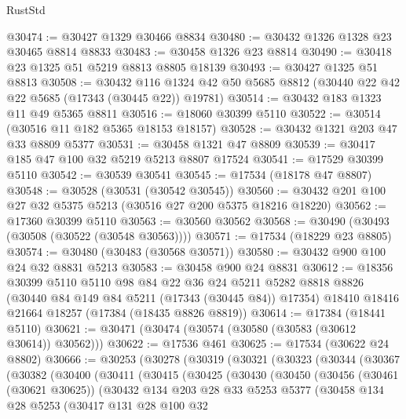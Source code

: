\begin{lexlean}{RustStd}
\begin{coremodule}
@30474 := @30427 @1329 @30466 @8834
@30480 := @30432 @1326 @1328 @23 @30465 @8814 @8833
@30483 := @30458 @1326 @23 @8814
@30490 := @30418 @23 @1325 @51 @5219 @8813 @8805 @18139
@30493 := @30427 @1325 @51 @8813
@30508 := @30432
    @116
    @1324
    @42
    @50
    @5685
    @8812
    (@30440 @22 @42 @22 @5685 (@17343 (@30445 @22)) @19781)
@30514 := @30432 @183 @1323 @11 @49 @5365 @8811
@30516 := @18060 @30399 @5110
@30522 := @30514 (@30516 @11 @182 @5365 @18153 @18157)
@30528 := @30432 @1321 @203 @47 @33 @8809 @5377
@30531 := @30458 @1321 @47 @8809
@30539 := @30417 @185 @47 @100 @32 @5219 @5213 @8807 @17524
@30541 := @17529 @30399 @5110
@30542 := @30539 @30541
@30545 := @17534 (@18178 @47 @8807)
@30548 := @30528 (@30531 (@30542 @30545))
@30560 := @30432 @201 @100 @27 @32 @5375 @5213 (@30516 @27 @200 @5375 @18216 @18220)
@30562 := @17360 @30399 @5110
@30563 := @30560 @30562
@30568 := @30490 (@30493 (@30508 (@30522 (@30548 @30563))))
@30571 := @17534 (@18229 @23 @8805)
@30574 := @30480 (@30483 (@30568 @30571))
@30580 := @30432 @900 @100 @24 @32 @8831 @5213
@30583 := @30458 @900 @24 @8831
@30612 := @18356
    @30399
    @5110
    @5110
    @98
    @84
    @22
    @36
    @24
    @5211
    @5282
    @8818
    @8826
    (@30440 @84 @149 @84 @5211 (@17343 (@30445 @84)) @17354)
    @18410
    @18416
    @21664
    @18257
    (@17384 (@18435 @8826 @8819))
@30614 := @17384 (@18441 @5110)
@30621 := @30471 (@30474 (@30574 (@30580 (@30583 (@30612 @30614)) @30562)))
@30622 := @17536 @461
@30625 := @17534 (@30622 @24 @8802)
@30666 := @30253
    (@30278
      (@30319
        (@30321
          (@30323
            (@30344
              (@30367
                (@30382
                  (@30400
                    (@30411
                      (@30415
                        (@30425
                          (@30430
                            (@30450
                              (@30456
                                (@30461 (@30621 @30625))
                                (@30432
                                  @134
                                  @203
                                  @28
                                  @33
                                  @5253
                                  @5377
                                  (@30458
                                    @134
                                    @28
                                    @5253
                                    (@30417
                                      @131
                                      @28
                                      @100
                                      @32

\end{coremodule}
\end{lexlean}
